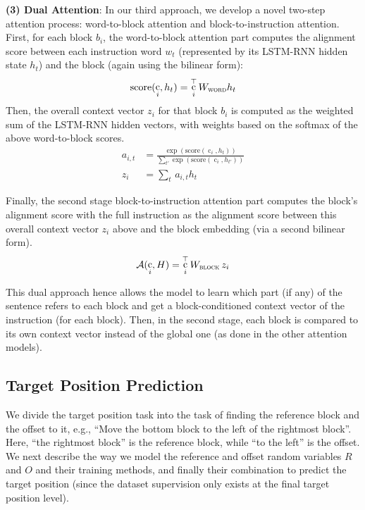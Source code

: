 \documentclass[letterpaper]{article} %
\DeclareMathOperator{\embb}{c}
\begin{document}
\textbf{(3) Dual Attention}:
In our third approach, we develop a novel two-step attention process: word-to-block attention and block-to-instruction attention. 
First, for each block $b_i$, the word-to-block attention part computes the alignment score between each instruction word $w_t$ (represented by its LSTM-RNN hidden state $h_t$) and the block (again using the bilinear form):
\begin{equation}
\text{score}(\embb_i, h_t) = \embb_i^{\top} W_{\textsc{word}} h_t
\end{equation}
Then, the overall context vector $z_i$ for that block $b_i$ is computed as the weighted sum of the LSTM-RNN hidden vectors, with weights based on the softmax of the above word-to-block scores. 
\begin{align}
a_{i,t} & = \frac{\exp \left( \text{score}(\embb_i, h_t) \right) }{\sum_{t'} \exp \left( \text{score}(\embb_i, h_{t'}) \right) } \\
z_i & = \sum_t\, a_{i,t} h_t
\end{align}

Finally, the second stage block-to-instruction attention part computes the block's alignment score with the full instruction as the alignment score between this overall context vector $z_i$ above and the block embedding (via a second bilinear form). 
\begin{equation}
\mathcal{A}(\embb_i, H) = \embb_i^{\top} W_{\textsc{block}} \, z_i
\end{equation}

This dual approach hence allows the model to learn which part (if any) of the sentence refers to each block and get a block-conditioned context vector of the instruction (for each block). Then, in the second stage, each block is compared to its own context vector instead of the global one (as done in the other attention models).


\subsection{Target Position Prediction}

We divide the target position task into the task of finding the reference block and the offset to it, e.g., ``Move the bottom block to the left of the rightmost block''. Here, ``the rightmost block'' is the reference block, while ``to the left'' is the offset.
%
We next describe the way we model the reference and offset random variables $R$ and $O$ and their training methods, and finally their combination to predict the target position (since the dataset supervision only exists at the final target position level).
\end{document}

